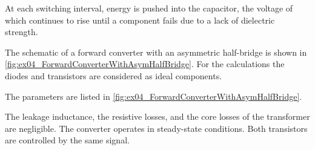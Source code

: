 \begin{solutionblock}

At each switching interval, energy is pushed into the capacitor, the voltage of which continues to rise until a component fails due to a lack of dielectric strength.    
\end{solutionblock}



The schematic of a forward converter with an asymmetric half-bridge is shown in \autoref{fig:ex04_ForwardConverterWithAsymHalfBridge}. 
For the calculations the diodes and transistors are considered as ideal components.



The parameters are listed in \autoref{fig:ex04_ForwardConverterWithAsymHalfBridge}.


\FloatBarrier
The leakage inductance, the resistive losses, and the core losses of the transformer are negligible. 
The converter operates in steady-state conditions. Both transistors are controlled by the same signal.





